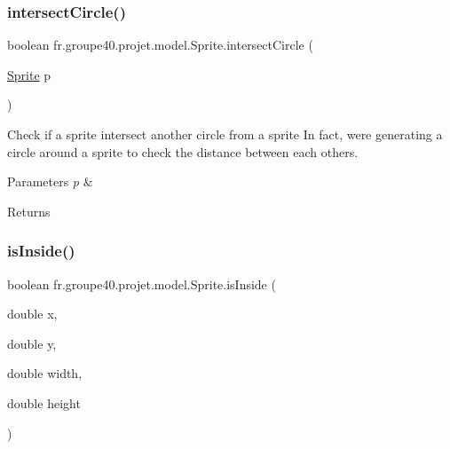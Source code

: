 \subsubsection{\texorpdfstring{intersect\+Circle()}{intersectCircle()}\hspace{0.1cm}{\footnotesize\ttfamily [2/2]}}
{\footnotesize\ttfamily boolean fr.\+groupe40.\+projet.\+model.\+Sprite.\+intersect\+Circle (\begin{DoxyParamCaption}\item[{\mbox{\hyperlink{classfr_1_1groupe40_1_1projet_1_1model_1_1_sprite}{Sprite}}}]{p }\end{DoxyParamCaption})}



Check if a sprite intersect another circle from a sprite In fact, we\textquotesingle{}re generating a circle around a sprite to check the distance between each others. 


\begin{DoxyParams}{Parameters}
{\em p} & \\
\hline
\end{DoxyParams}
\begin{DoxyReturn}{Returns}

\end{DoxyReturn}
\mbox{\label{classfr_1_1groupe40_1_1projet_1_1model_1_1_sprite_a7c826b664373d244725751f74c057b12}} 
\subsubsection{\texorpdfstring{is\+Inside()}{isInside()}\hspace{0.1cm}{\footnotesize\ttfamily [1/2]}}
{\footnotesize\ttfamily boolean fr.\+groupe40.\+projet.\+model.\+Sprite.\+is\+Inside (\begin{DoxyParamCaption}\item[{double}]{x,  }\item[{double}]{y,  }\item[{double}]{width,  }\item[{double}]{height }\end{DoxyParamCaption})}



